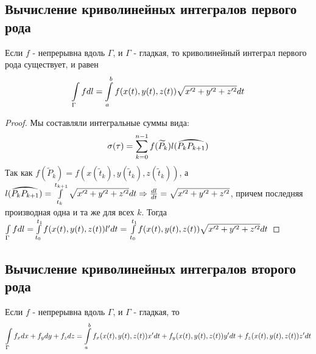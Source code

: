 \subsection{Вычисление криволинейных интегралов первого рода}

\begin{theorem}
	Если $f$ - непрерывна вдоль $\Gamma$, и $\Gamma$ - гладкая, 
	то криволинейный интеграл первого рода существует, и равен
	\begin{gather*}
		\int\limits_{\Gamma}f dl = \int\limits_{a}^{b} f(x(t), y(t), z(t))\sqrt{x'^2 + y'^2 + z'^2} dt
	\end{gather*}
	
	\begin{proof}
		Мы составляли интегральные суммы вида:
		\begin{gather*}
			\sigma(\tau) = \sumlr{k = 0}{n - 1} f(\widetilde{P}_k)l(\wideparen{P_k P_{k + 1}})
		\end{gather*}
		Так как $f(\widetilde{P}_k) = f(x(\widetilde{t}_k), y(\widetilde{t}_k), z(\widetilde{t}_k))$, 
		а $l(\wideparen{P_k P_{k + 1}}) = \intlr{t_k}{t_{k + 1}} \sqrt{x'^2 + y'^2 + z'^2}dt 
		\Rightarrow \frac{dl}{dt} = \sqrt{x'^2 + y'^2 + z'^2}$, причем последняя производная 
		одна и та же для всех $k$. Тогда
		$\int\limits_{\Gamma} fdl = \int\limits_{t_0}^{t_1} f(x(t), y(t), z(t))l' dt =\\
		\int\limits_{t_0}^{t_1} f(x(t), y(t), z(t))\sqrt{x'^2 + y'^2 + z'^2} dt $
	\end{proof}
\end{theorem}

\subsection{Вычисление криволинейных интегралов второго рода}

\begin{theorem}
	Если $f$ - непрерывна вдоль $\Gamma$, и $\Gamma$ - гладкая, то 
	\begin{gather*}
		\int\limits_{\Gamma} f_x dx + f_ydy + f_zdz = 
		\int\limits_{a}^{b} f_x(x(t), y(t), z(t))x' dt + 
					f_y(x(t), y(t), z(t))y' dt +
					f_z(x(t), y(t), z(t))z' dt
	\end{gather*}
\end{theorem}

